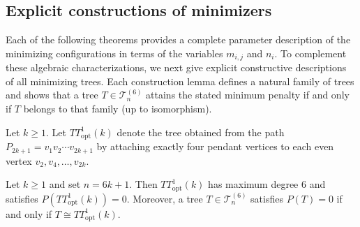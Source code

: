 \documentclass[preprint,12pt]{elsarticle}
\begin{document}
\subsection{Explicit constructions of minimizers}
\label{subsec:construct}

\medskip

Each of the following theorems provides a complete parameter description of the
minimizing configurations in terms of the variables $m_{i,j}$ and $n_i$. To
complement these algebraic characterizations, we next give explicit constructive
descriptions of all minimizing trees. Each construction lemma defines a natural family of trees and shows
that a tree $T\in\mathcal{T}_n^{(6)}$ attains the stated minimum penalty if and only if
$T$ belongs to that family (up to isomorphism).



\medskip

Let $k\ge 1$.
Let $TT^1_{\mathrm{opt}}(k)$ denote the tree obtained from the path
$P_{2k+1}=v_1v_2\cdots v_{2k+1}$ by attaching exactly four pendant vertices to
each even vertex $v_{2},v_{4},\dots,v_{2k}$.

\begin{lemma}
\label{lem:TT1opt-delta6}
Let $k\ge 1$ and set $n=6k+1$.
Then $TT^1_{\mathrm{opt}}(k)$ has maximum degree $6$ and satisfies $P(TT^1_{\mathrm{opt}}(k))=0$.
Moreover, a tree $T\in\mathcal{T}_{n}^{(6)}$ satisfies $P(T)=0$ if and only if
$T\cong TT^1_{\mathrm{opt}}(k)$.
\end{lemma}
\end{document}
